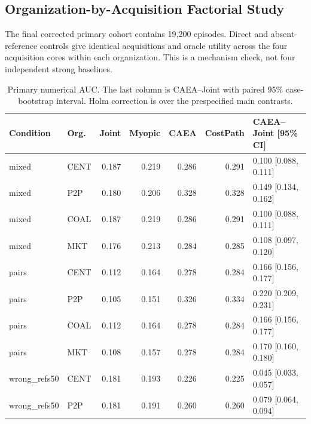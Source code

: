 \subsection{Organization-by-Acquisition Factorial Study}

The final corrected primary cohort contains 19,200 episodes. Direct and absent-reference controls give identical acquisitions and oracle utility across the four acquisition cores within each organization. This is a mechanism check, not four independent strong baselines.

\begin{table}[t]\centering\small

\caption{Primary numerical AUC. The last column is CAEA--Joint with paired 95\% case-bootstrap interval. Holm correction is over the prespecified main contrasts.}

\begin{tabular}{llrrrrl}\toprule Condition & Org. & Joint & Myopic & CAEA & CostPath & CAEA--Joint [95\% CI]\\\midrule

mixed & CENT & 0.187 & 0.219 & 0.286 & 0.291 & 0.100 [0.088, 0.111]\\

mixed & P2P & 0.180 & 0.206 & 0.328 & 0.328 & 0.149 [0.134, 0.162]\\

mixed & COAL & 0.187 & 0.219 & 0.286 & 0.291 & 0.100 [0.088, 0.111]\\

mixed & MKT & 0.176 & 0.213 & 0.284 & 0.285 & 0.108 [0.097, 0.120]\\

pairs & CENT & 0.112 & 0.164 & 0.278 & 0.284 & 0.166 [0.156, 0.177]\\

pairs & P2P & 0.105 & 0.151 & 0.326 & 0.334 & 0.220 [0.209, 0.231]\\

pairs & COAL & 0.112 & 0.164 & 0.278 & 0.284 & 0.166 [0.156, 0.177]\\

pairs & MKT & 0.108 & 0.157 & 0.278 & 0.284 & 0.170 [0.160, 0.180]\\

wrong\_refs50 & CENT & 0.181 & 0.193 & 0.226 & 0.225 & 0.045 [0.033, 0.057]\\

wrong\_refs50 & P2P & 0.181 & 0.191 & 0.260 & 0.260 & 0.079 [0.064, 0.094]\\


\end{tabular}
\end{table}
